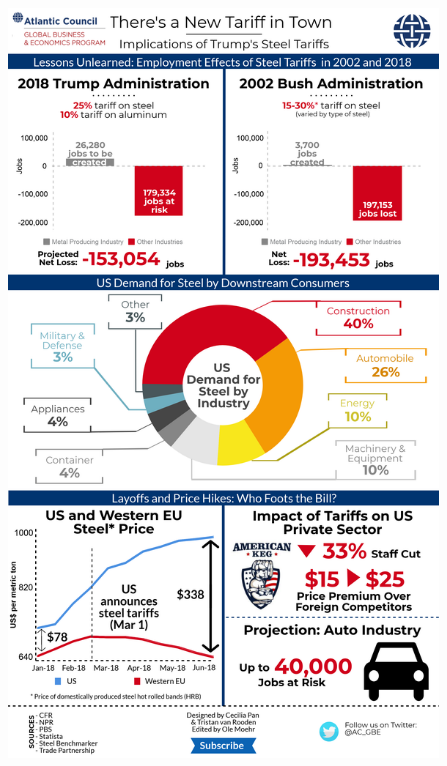\documentclass[
  ignorenonframetext,
]{beamer}
\begin{document}
\begin{frame}{}
\protect\hypertarget{section-16}{}
\includegraphics[width=\textwidth,height=7.8125in]{figures/steel_eg.png}
\end{frame}
\end{document}
